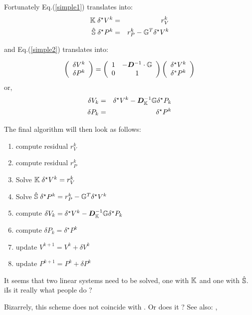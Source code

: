 Fortunately Eq.(\ref{simple1})
translates into:
\begin{eqnarray}
{\mathbb{K}} \; \delta^\star V^k &=&  r_V^k   \\
\hat{{\mathbb{S}}} \;  \delta^\star P^k &=&  r_P^k - {\mathbb{G}}^T \delta^\star V^k 
\end{eqnarray}

and Eq.(\ref{simple2}) 
translates into:

\[
\left(
\begin{array}{c}
\delta V^k \\ \delta P^k
\end{array}
\right)
=
\left(
\begin{array}{cc}
1 & -{\bm D}^{-1}\cdot {\mathbb{G}} \\
0 & 1
\end{array}
\right)
\left(
\begin{array}{c}
\delta^\star V^k \\ \delta^* P^k
\end{array}
\right)
\]
or, 
\begin{eqnarray}
\delta V_k &=& \delta^\star V^k  -{\bm D}_{\mathbb{K}}^{-1} {\mathbb{G}} \delta^\star P_k \\
\delta P_k &=& \delta^\star P^k
\end{eqnarray}

The final algorithm will then look as follows:

\begin{enumerate}
\item compute residual $r_V^k$
\item compute residual $r_P^k$
\item Solve ${\mathbb{K}}  \; \delta^\star V^k =  r_V^k  $
\item Solve $\hat{{\mathbb{S}}} \; \delta^\star P^k =  r_P^k - {\mathbb{G}}^T \delta^\star V^k $
\item compute $\delta V_k = \delta^\star V^k  -{\bm D}_{\mathbb{K}}^{-1} {\mathbb{G}} \delta^\star P_k $
\item compute $\delta P_k = \delta^\star P^k$
\item update $V^{k+1} = V^k + \delta V^k$
\item update $P^{k+1} = P^k + \delta P^k$
\end{enumerate}


{\color{red} It seems that two linear systems need to 
be solved, one with ${\mathbb{K}}$ and one with $\hat{{\mathbb{S}}}$. 
iIs it really what people do ?}



Bizarrely, this scheme does not coincide with \cite{urvs09}. Or does it ?
See also: \cite{eche13}, \cite{brsa97b}






















